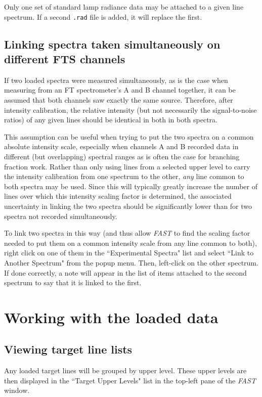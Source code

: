 \documentclass[a4paper,12pt]{report}
\newcommand{\fast}{\emph{FAST} }
\begin{document}
Only one set of standard lamp radiance data may be attached to a given line spectrum. If a second \verb|.rad| file is added, it will replace the first.

\subsection{Linking spectra taken simultaneously on different FTS channels}
\label{section:linkspectra}
If two loaded spectra were measured simultaneously, as is the case when measuring from an FT spectrometer's A and B channel together, it can be assumed that both channels saw exactly the same source. Therefore, after intensity calibration, the relative intensity (but not necessarily the signal-to-noise ratios) of any given lines should be identical in both in both spectra. 

This assumption can be useful when trying to put the two spectra on a common absolute intensity scale, especially when channels A and B recorded data in different (but overlapping) spectral ranges as is often the case for branching fraction work. Rather than only using lines from a selected upper level to carry the intensity calibration from one spectrum to the other, \emph{any} line common to both spectra may be used. Since this will typically greatly increase the number of lines over which this intensity scaling factor is determined, the associated uncertainty in linking the two spectra should be significantly lower than for two spectra not recorded simultaneously.

To link two spectra in this way (and thus allow \fast to find the scaling factor needed to put them on a common intensity scale from any line common to both), right click on one of them in the ``Experimental Spectra" list and select ``Link to Another Spectrum" from the popup menu. Then, left-click on the other spectrum. If done correctly, a note will appear in the list of items attached to the second spectrum to say that it is linked to the first.

\section{Working with the loaded data}

\subsection{Viewing target line lists}
Any loaded target lines will be grouped by upper level. These upper levels are then displayed in the ``Target Upper Levels" list in the top-left pane of the \fast window. 
\end{document}
